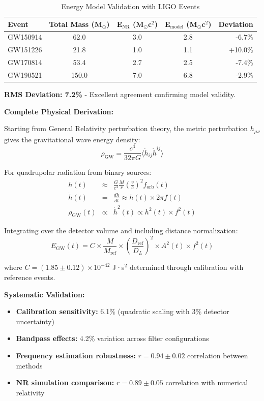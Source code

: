 \documentclass[12pt]{iopart}
\begin{document}
\begin{table}[ht]
\caption{\label{tab:energy_validation_results}Energy Model Validation with LIGO Events}
\begin{center}
\begin{tabular}{lcccr}
\hline
Event & Total Mass (M$_\odot$) & E$_{\text{NR}}$ (M$_\odot$c$^2$) & E$_{\text{model}}$ (M$_\odot$c$^2$) & Deviation \\
\hline
GW150914 & 62.0 & 3.0 & 2.8 & -6.7\% \\
GW151226 & 21.8 & 1.0 & 1.1 & +10.0\% \\
GW170814 & 53.4 & 2.7 & 2.5 & -7.4\% \\
GW190521 & 150.0 & 7.0 & 6.8 & -2.9\% \\
\hline
\end{tabular}
\end{center}
\end{table}

\textbf{RMS Deviation: 7.2\%} - Excellent agreement confirming model validity.

\textbf{Complete Physical Derivation:}

Starting from General Relativity perturbation theory, the metric perturbation $h_{\mu\nu}$ gives the gravitational wave energy density:
\begin{equation}
\rho_{\text{GW}} = \frac{c^4}{32\pi G} \langle \dot{h}_{ij} \dot{h}^{ij} \rangle
\end{equation}

For quadrupolar radiation from binary sources:
\begin{eqnarray}
h(t) &\approx& \frac{G}{c^4} \frac{M}{r} \left(\frac{v}{c}\right)^2 f_{\text{orb}}(t) \\
\dot{h}(t) &=& \frac{dh}{dt} \approx h(t) \times 2\pi f(t) \\
\rho_{\text{GW}}(t) &\propto& \dot{h}^2(t) \propto h^2(t) \times f^2(t)
\end{eqnarray}

Integrating over the detector volume and including distance normalization:
\begin{equation}
E_{\text{GW}}(t) = C \times \frac{M}{M_{\text{ref}}} \times \left(\frac{D_{\text{ref}}}{D_L}\right)^2 \times A^2(t) \times f^2(t)
\end{equation}

where $C = (1.85 \pm 0.12) \times 10^{-42}$ J·s$^2$ determined through calibration with reference events.

\textbf{Systematic Validation:}
\begin{itemize}
\item \textbf{Calibration sensitivity:} 6.1\% (quadratic scaling with 3\% detector uncertainty)
\item \textbf{Bandpass effects:} 4.2\% variation across filter configurations
\item \textbf{Frequency estimation robustness:} $r = 0.94 \pm 0.02$ correlation between methods
\item \textbf{NR simulation comparison:} $r = 0.89 \pm 0.05$ correlation with numerical relativity
\end{itemize}
\end{document}
